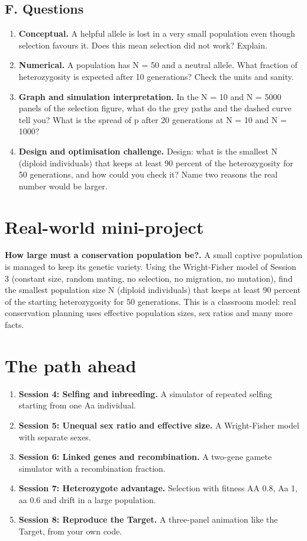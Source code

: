 \documentclass[11pt,a4paper]{article}
\begin{document}
\subsection*{F. Questions}
\begin{enumerate}[nosep]
\item \textbf{Conceptual.} A helpful allele is lost in a very small population even though selection favours it. Does this mean selection did not work? Explain.
\item \textbf{Numerical.} A population has N = 50 and a neutral allele. What fraction of heterozygosity is expected after 10 generations? Check the units and sanity.
\item \textbf{Graph and simulation interpretation.} In the N = 10 and N = 5000 panels of the selection figure, what do the grey paths and the dashed curve tell you? What is the spread of p after 20 generations at N = 10 and N = 1000?
\item \textbf{Design and optimisation challenge.} Design: what is the smallest N (diploid individuals) that keeps at least 90 percent of the heterozygosity for 50 generations, and how could you check it? Name two reasons the real number would be larger.
\end{enumerate}

\section{Real-world mini-project}
\textbf{How large must a conservation population be?.} A small captive population is managed to keep its genetic variety. Using the Wright-Fisher model of Session 3 (constant size, random mating, no selection, no migration, no mutation), find the smallest population size N (diploid individuals) that keeps at least 90 percent of the starting heterozygosity for 50 generations. This is a classroom model: real conservation planning uses effective population sizes, sex ratios and many more facts.

\section{The path ahead}
\begin{enumerate}[nosep]
\item \textbf{Session 4: Selfing and inbreeding.} A simulator of repeated selfing starting from one Aa individual.
\item \textbf{Session 5: Unequal sex ratio and effective size.} A Wright-Fisher model with separate sexes.
\item \textbf{Session 6: Linked genes and recombination.} A two-gene gamete simulator with a recombination fraction.
\item \textbf{Session 7: Heterozygote advantage.} Selection with fitness AA 0.8, Aa 1, aa 0.6 and drift in a large population.
\item \textbf{Session 8: Reproduce the Target.} A three-panel animation like the Target, from your own code.
\end{enumerate}
\end{document}
